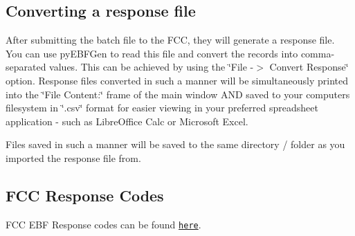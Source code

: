 \subsection*{Converting a response file}

After submitting the batch file to the F\+CC, they will generate a response file. You can use py\+E\+B\+F\+Gen to read this file and convert the records into comma-\/separated values. This can be achieved by using the \char`\"{}\+File -\/$>$ Convert Response\char`\"{} option. Response files converted in such a manner will be simultaneously printed into the \char`\"{}\+File Content\+:\char`\"{} frame of the main window A\+ND saved to your computer\textquotesingle{}s filesystem in \char`\"{}.\+csv\char`\"{} format for easier viewing in your preferred spreadsheet application -\/ such as Libre\+Office Calc or Microsoft Excel.

Files saved in such a manner will be saved to the same directory / folder as you imported the response file from.

\subsection*{F\+CC Response Codes}

F\+CC E\+BF Response codes can be found \href{https://www.fcc.gov/sites/default/files/ebf_error_codes_09072017.pdf}{\tt here}. 